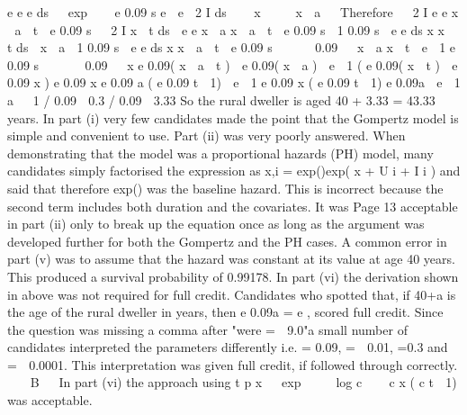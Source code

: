 e e e ds   exp    e 0.09 s e  e  2 I ds 
  x
 
  x  a
 
Therefore
  2 I
e e
x  a  t

e
0.09 s
  2 I
x  t
ds  e e
x  a
x  a  t

e
0.09 s
 1 0.09 s
 e
e
ds
x
x  t
ds 
x  a
 1 0.09 s
 e
e
ds
x
x  a  t
 e 0.09 s 


  0.09   x  a
x  t
 e  1 e 0.09 s 


  0.09   x
e 0.09( x  a  t )  e 0.09( x  a )  e  1 ( e 0.09( x  t )  e 0.09 x )
e 0.09 x e 0.09 a ( e 0.09 t  1)  e  1 e 0.09 x ( e 0.09 t  1)
e 0.09a  e  1
a   1 / 0.09  0.3 / 0.09  3.33
So the rural dweller is aged 40 + 3.33 = 43.33 years.
In part (i) very few candidates made the point that the Gompertz model is simple and
convenient to use. Part (ii) was very poorly answered. When demonstrating that the model
was a proportional hazards (PH) model, many candidates simply factorised the expression as
\mu x,i = exp(\alpha)exp( x +  U i +  I i ) and said that therefore exp(\alpha) was the baseline hazard.
This is incorrect because the second term includes both duration and the covariates. It was
Page 13%
acceptable in part (ii) only to break up the equation once as long as the argument was
developed further for both the Gompertz and the PH cases. A common error in part (v) was
to assume that the hazard was constant at its value at age 40 years. This produced a survival
probability of 0.99178. In part (vi) the derivation shown in above was not required for full
credit. Candidates who spotted that, if 40+a is the age of the rural dweller in years,
then e 0.09a = e  , scored full credit.
Since the question was missing a comma after "were \alpha =  9.0"a small number of candidates
interpreted the parameters differently i.e. \alpha = 0.09,  =  0.01,  =0.3 and  =  0.0001.
This interpretation was given full credit, if followed through correctly.

  B  
In part (vi) the approach using t p x   exp 
 
 log c  

c x ( c t  1)
was acceptable.
